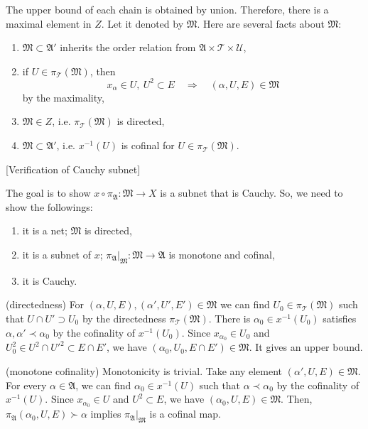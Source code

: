 \documentclass[11pt]{amsart}
\begin{document}
\begin{pf}[1 of Theorem 1.1]
The upper bound of each chain is obtained by union.
Therefore, there is a maximal element in $Z$.
Let it denoted by $\mathfrak{M}$.
Here are several facts about $\mathfrak{M}$:
\begin{enumerate}
\item $\mathfrak{M}\subset\mathfrak{A}'$ inherits the order relation from $\mathfrak{A}\times\mathcal{T}\times\mathcal{U}$,
\item if $U\in\pi_\mathcal{T}(\mathfrak{M})$, then \[x_\alpha\in U,\ U^2\subset E\quad\Rightarrow\quad(\alpha,U,E)\in\mathfrak{M}\] by the maximality,
\item $\mathfrak{M}\in Z$, i.e. $\pi_\mathcal{T}(\mathfrak{M})$ is directed,
\item $\mathfrak{M}\subset\mathfrak{A}'$, i.e. $x^{-1}(U)$ is cofinal for $U\in\pi_\mathcal{T}(\mathfrak{M})$.
\end{enumerate}

[Verification of Cauchy subnet]

The goal is to show $x\circ\pi_\mathfrak{A}:\mathfrak{M}\to X$ is a subnet that is Cauchy.
So, we need to show the followings:
\begin{enumerate}
\item it is a net; $\mathfrak{M}$ is directed,
\item it is a subnet of $x$; $\pi_\mathfrak{A}|_\mathfrak{M}:\mathfrak{M}\to\mathfrak{A}$ is monotone and cofinal,
\item it is Cauchy.
\end{enumerate}

(directedness)
For $(\alpha,U,E),(\alpha',U',E')\in\mathfrak{M}$ we can find $U_0\in\pi_\mathcal{T}(\mathfrak{M})$ such that $U\cap U'\supset U_0$ by the directedness $\pi_\mathcal{T}(\mathfrak{M})$.
There is $\alpha_0\in x^{-1}(U_0)$ satisfies $\alpha,\alpha'\prec\alpha_0$ by the cofinality of $x^{-1}(U_0)$.
Since $x_{\alpha_0}\in U_0$ and $U_0^2\in U^2\cap U'^2\subset E\cap E'$, we have $(\alpha_0,U_0,E\cap E')\in\mathfrak{M}$.
It gives an upper bound.

(monotone cofinality)
Monotonicity is trivial.
Take any element $(\alpha',U,E)\in\mathfrak{M}$.
For every $\alpha\in\mathfrak{A}$, we can find $\alpha_0\in x^{-1}(U)$ such that $\alpha\prec\alpha_0$ by the cofinality of $x^{-1}(U)$.
Since $x_{\alpha_0}\in U$ and $U^2\subset E$, we have $(\alpha_0,U,E)\in\mathfrak{M}$.
Then, $\pi_\mathfrak{A}(\alpha_0,U,E)\succ\alpha$ implies $\pi_\mathfrak{A}|_\mathfrak{M}$ is a cofinal map.


\end{pf}
\end{document}
